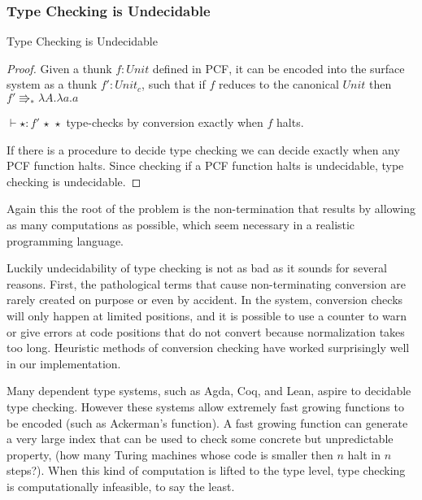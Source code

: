 \subsubsection{Type Checking is Undecidable}
\begin{thm}
Type Checking is Undecidable
\end{thm}
 
\begin{proof}
Given a thunk $f:Unit$ defined in PCF, it can be encoded into the surface system as a thunk $f':Unit_{c}$, such that if $f$ reduces to the canonical $Unit$ then $f'\Rrightarrow_{\ast}\lambda A.\lambda a.a$
 
$\vdash\star:f'\,\star\,\star$ type-checks by conversion exactly when $f$ halts.
 
If there is a procedure to decide type checking we can decide exactly when any PCF function halts.
Since checking if a PCF function halts is undecidable, type checking is undecidable.
 
\end{proof}
 
Again this the root of the problem is the non-termination that results by allowing as many computations as possible, which seem necessary in a realistic programming language.
 
Luckily undecidability of type checking is not as bad as it sounds for several reasons.
First, the pathological terms that cause non-terminating conversion are rarely created on purpose or even by accident.
In the \bidir{} system, conversion checks will only happen at limited positions, and it is possible to use a counter to warn or give errors at code positions that do not convert because normalization takes too long.
Heuristic methods of conversion checking have worked surprisingly well in our implementation.
 
Many dependent type systems, such as Agda, Coq, and Lean, aspire to decidable type checking.
However these systems allow extremely fast growing functions to be encoded (such as Ackerman's function).
A fast growing function can generate a very large index that can be used to check some concrete but unpredictable property, (how many Turing machines whose code is smaller then $n$ halt in $n$ steps?).
When this kind of computation is lifted to the type level, type checking is computationally infeasible, to say the least.
 
